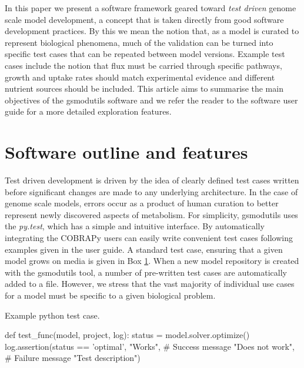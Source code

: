 \documentclass{bioinfo}
\begin{document}
In this paper we present a software framework geared toward \textit{test driven} genome scale model development, a concept that is taken directly from good software development practices.
By this we mean the notion that, as a model is curated to represent biological phenomena, much of the validation can be turned into specific test cases that can be repeated between model versions.
Example test cases include the notion that flux must be carried through specific pathways, growth and uptake rates should match experimental evidence and different nutrient sources should be included.
This article aims to summarise the main objectives of the gsmodutils software and we refer the reader to the software user guide for a more detailed exploration features.



\section{Software outline and features}
Test driven development is driven by the idea of clearly defined test cases written before significant changes are made to any underlying architecture.
In the case of genome scale models, errors occur as a product of human curation to better represent newly discovered aspects of metabolism.
For simplicity, gsmodutils uses the \textit{py.test}, which has a simple and intuitive interface.
By automatically integrating the COBRAPy \cite{ebrahim2013cobrapy} users can easily write convenient test cases following examples given in the user guide.
A standard test case, ensuring that a given model grows on media is given in Box \ref{}.
When a new model repository is created with the gsmodutils tool, a number of pre-written test cases are automatically added to a file.
However, we stress that the vast majority of individual use cases for a model must be specific to a given biological problem.


Example python test case.
\begin{verbatim*}
def test_func(model, project, log):
    status = model.solver.optimize()
    log.assertion(status == 'optimal',
                  "Works", # Success message
                  "Does not work", # Failure message
                  "Test description")
\end{verbatim*}
\end{document}
